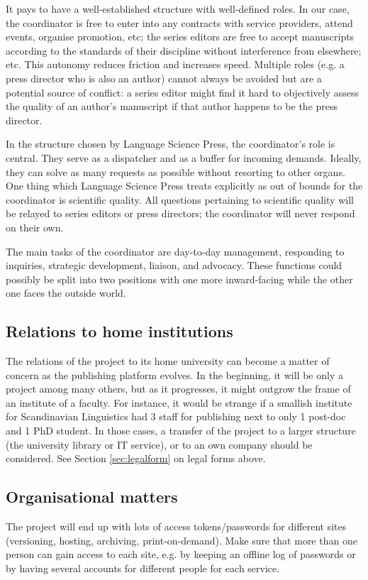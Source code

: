 \documentclass[nonflat,modfonts,output=book] {langsci/langscibook}
\begin{document}
It pays to have a well-established structure with well-defined roles. In our case, the coordinator is free to enter into any contracts with service providers, attend events, organise promotion, etc; the series editors are free to accept manuscripts according to the standards of their discipline without interference from elsewhere; etc.  This autonomy reduces friction and increases speed. Multiple roles (e.g. a press director who is also an author) cannot always be avoided but are a potential source of conflict: a series editor might find it hard to objectively assess the quality of an author's manuscript if that author happens to be the press director. 

In the structure chosen by Language Science Press, the coordinator's role is central. They serve as a dispatcher and as a buffer for incoming demands. Ideally, they can solve as many requests as possible without resorting to other organs. One thing which Language Science Press treats explicitly as out of bounds for the coordinator is scientific quality. All questions pertaining to scientific quality will be relayed to series editors or press directors; the coordinator will never respond on their own. 

The main tasks of the coordinator are day-to-day management, responding to inquiries, strategic development, liaison, and advocacy. These functions could possibly be split into two positions with one more inward-facing while the other one faces the outside world. 

\subsection{Relations to home institutions}
The relations of the project to its home university can become a matter of concern as the publishing platform evolves. In the beginning, it will be only a project among many others, but as it progresses, it might outgrow the frame of an institute of a faculty. For instance, it would be strange if a smallish institute for Scandinavian Linguistics had 3 staff for publishing next to only 1 post-doc and 1 PhD student. In those cases, a transfer of the project to a larger structure (the university library or IT service), or to an own company should be considered. See Section \ref{sec:legalform} on legal forms above. 

\subsection{Organisational matters}
The project will end up with lots of access tokens/passwords for different sites (versioning, hosting, archiving, print-on-demand). Make sure that more than one person can gain access to each site, e.g. by keeping an offline log of passwords or by having several accounts for different people for each service. 
\end{document}
